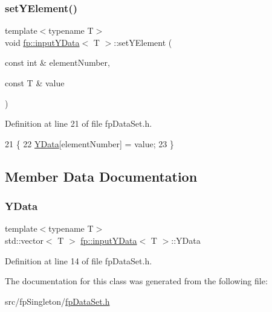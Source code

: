 \subsubsection{\texorpdfstring{set\+Y\+Element()}{setYElement()}}
{\footnotesize\ttfamily template$<$typename T$>$ \\
void \hyperlink{classfp_1_1inputYData}{fp\+::input\+Y\+Data}$<$ T $>$\+::set\+Y\+Element (\begin{DoxyParamCaption}\item[{const int \&}]{element\+Number,  }\item[{const T \&}]{value }\end{DoxyParamCaption})\hspace{0.3cm}{\ttfamily [inline]}}



Definition at line 21 of file fp\+Data\+Set.\+h.


\begin{DoxyCode}
21                                                                          \{
22             \hyperlink{classfp_1_1inputYData_af9a5f5190739918b5b5b209ef3b18de3}{YData}[elementNumber] = value;
23         \}
\end{DoxyCode}


\subsection{Member Data Documentation}
\mbox{\label{classfp_1_1inputYData_af9a5f5190739918b5b5b209ef3b18de3}} 
\subsubsection{\texorpdfstring{Y\+Data}{YData}}
{\footnotesize\ttfamily template$<$typename T$>$ \\
std\+::vector$<$ T $>$ \hyperlink{classfp_1_1inputYData}{fp\+::input\+Y\+Data}$<$ T $>$\+::Y\+Data\hspace{0.3cm}{\ttfamily [protected]}}



Definition at line 14 of file fp\+Data\+Set.\+h.



The documentation for this class was generated from the following file\+:\begin{DoxyCompactItemize}
\item 
src/fp\+Singleton/\hyperlink{fpDataSet_8h}{fp\+Data\+Set.\+h}\end{DoxyCompactItemize}
